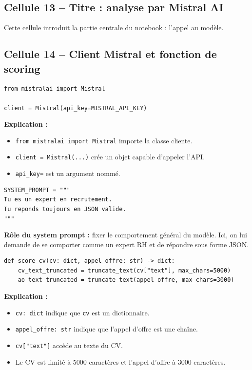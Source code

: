 \documentclass[12pt,a4paper]{article}
\begin{document}
\subsection{Cellule 13 -- Titre : analyse par Mistral AI}

Cette cellule introduit la partie centrale du notebook : l'appel au modèle.

\subsection{Cellule 14 -- Client Mistral et fonction de scoring}

\begin{lstlisting}[style=pythonstyle]
from mistralai import Mistral

client = Mistral(api_key=MISTRAL_API_KEY)
\end{lstlisting}

\textbf{Explication :}
\begin{itemize}
  \item \texttt{from mistralai import Mistral} importe la classe cliente.
  \item \texttt{client = Mistral(...)} crée un objet capable d'appeler l'API.
  \item \texttt{api\_key=} est un argument nommé.
\end{itemize}

\begin{lstlisting}[style=pythonstyle]
SYSTEM_PROMPT = """
Tu es un expert en recrutement.
Tu reponds toujours en JSON valide.
"""
\end{lstlisting}

\textbf{Rôle du system prompt :} fixer le comportement général du modèle. Ici, on lui demande de se comporter comme un expert RH et de répondre sous forme JSON.

\begin{lstlisting}[style=pythonstyle]
def score_cv(cv: dict, appel_offre: str) -> dict:
    cv_text_truncated = truncate_text(cv["text"], max_chars=5000)
    ao_text_truncated = truncate_text(appel_offre, max_chars=3000)
\end{lstlisting}

\textbf{Explication :}
\begin{itemize}
  \item \texttt{cv: dict} indique que \texttt{cv} est un dictionnaire.
  \item \texttt{appel\_offre: str} indique que l'appel d'offre est une chaîne.
  \item \texttt{cv["text"]} accède au texte du CV.
  \item Le CV est limité à 5000 caractères et l'appel d'offre à 3000 caractères.
\end{itemize}
\end{document}

